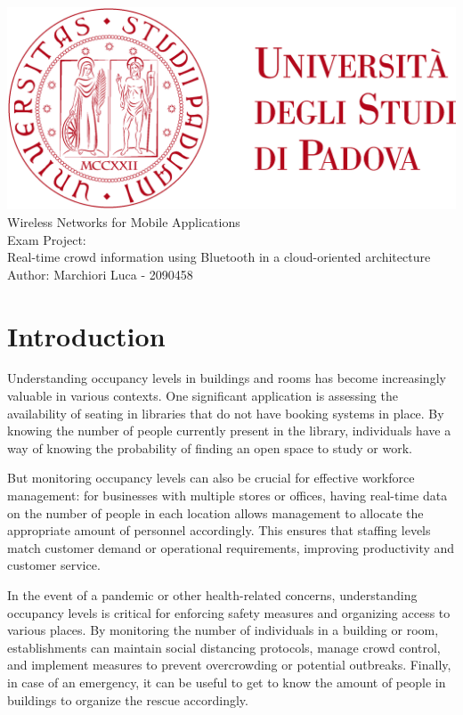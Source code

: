 \documentclass[a4paper, 11pt]{article}
\begin{document}
\begin{titlepage}
	\begin{center}
		\includegraphics[scale=0.1]{images/unipd_logo.png}\\		
		\vspace{4\baselineskip}
		\Huge Wireless Networks for Mobile Applications\\
        \vspace{4\baselineskip}
		\LARGE Exam Project: \\
        Real-time crowd information using Bluetooth in a cloud-oriented architecture\\
		\vfill
		Author: Marchiori Luca - 2090458\\
	\end{center}
\end{titlepage}


\tableofcontents

\newpage
\section{Introduction}
Understanding occupancy levels in buildings and rooms has become increasingly valuable in various contexts. One significant application is assessing the availability of seating in libraries that do not have booking systems in place. By knowing the number of people currently present in the library, individuals have a way of knowing the probability of finding an open space to study or work. 

But monitoring occupancy levels can also be crucial for effective workforce management: for businesses with multiple stores or offices, having real-time data on the number of people in each location allows management to allocate the appropriate amount of personnel accordingly. This ensures that staffing levels match customer demand or operational requirements, improving productivity and customer service.

In the event of a pandemic or other health-related concerns, understanding occupancy levels is critical for enforcing safety measures and organizing access to various places. By monitoring the number of individuals in a building or room, establishments can maintain social distancing protocols, manage crowd control, and implement measures to prevent overcrowding or potential outbreaks. Finally, in case of an emergency, it can be useful to get to know the amount of people in buildings to organize the rescue accordingly.
\end{document}
